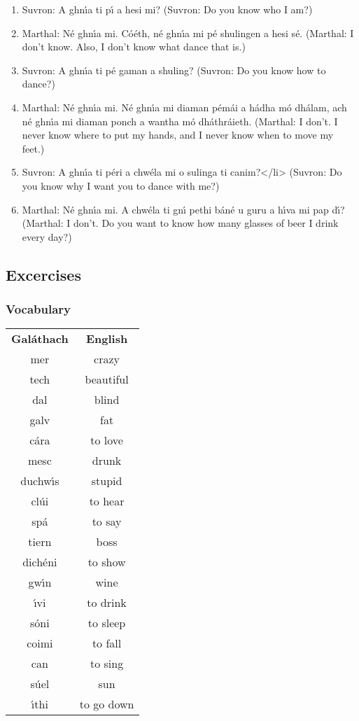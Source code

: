 \begin{enumerate}
  \item Suvron: A ghn\'{\i}a ti p\'{\i} a hesi mi?
  (Suvron: Do you know who I am?)
  \item Marthal: N\'{e} ghn\'{\i}a mi. C\'{o}\'{e}th, n\'{e} ghn\'{\i}a mi p\'{e} shulingen a hesi s\'{e}.
  (Marthal: I don't know. Also, I don't know what dance that is.)
  \item Suvron: A ghn\'{\i}a ti p\'{e} gaman a shuling?
  (Suvron: Do you know how to dance?)
  \item Marthal: N\'{e} ghn\'{\i}a mi. N\'{e} ghn\'{\i}a mi diaman p\'{e}m\'{a}i a h\'{a}dha m\'{o} dh\'{a}lam, ach n\'{e} ghn\'{\i}a mi diaman ponch a wantha m\'{o} dh\'{a}thr\'{a}ieth.
  (Marthal: I don't. I never know where to put my hands, and I never know when to move my feet.)
  \item Suvron: A ghn\'{\i}a ti p\'{e}ri a chw\'{e}la mi o sulinga ti canim?</li>
  (Suvron: Do you know why I want you to dance with me?)
  \item Marthal: N\'{e} ghn\'{\i}a mi. A chw\'{e}la ti gn\'{\i} pethi b\'{a}n\'{e} u guru a h\'{\i}va mi pap d\'{\i}?
  (Marthal: I don't. Do you want to know how many glasses of beer I drink every day?)
\end{enumerate}

\subsection{Excercises}

\subsubsection{Vocabulary}

\begin{table}[H]
\centering
\begin{tabular}{cc}
  \toprule
  \textbf{Gal\'{a}thach} & \textbf{English}\\
  \cmidrule(lr){1-1}\cmidrule(lr){2-2}
  mer & crazy\\
  tech & beautiful\\
  dal & blind\\
  galv & fat\\
  c\'{a}ra & to love\\
  mesc & drunk\\
  duchw\'{\i}s & stupid\\
  cl\'{u}i & to hear\\
  sp\'{a} & to say\\
  tiern & boss\\
  dich\'{e}ni & to show\\
  gw\'{\i}n & wine\\
  \'{\i}vi & to drink\\
  s\'{o}ni & to sleep\\
  coimi & to fall\\
  can & to sing\\
  s\'{u}el & sun\\
  \'{\i}thi & to go down\\
  \bottomrule
\end{tabular}
\label{vocab_exercise_lesson13}
\end{table}


